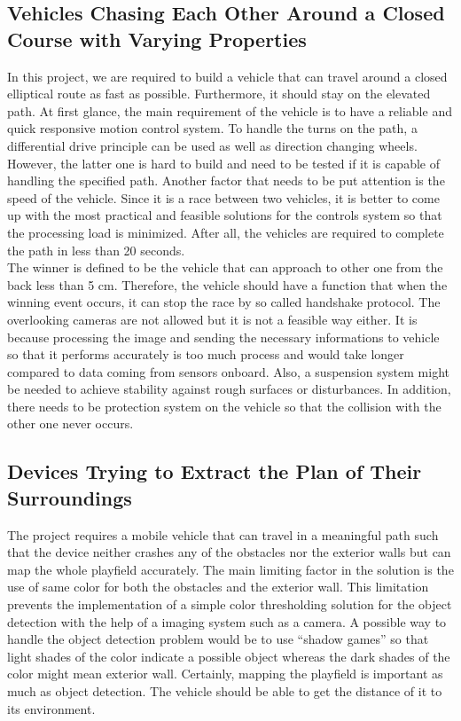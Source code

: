 \documentclass[a4paper,12pt]{article}
\begin{document}
\subsection{Vehicles Chasing Each Other Around a Closed Course with Varying Properties}

In this project, we are required to build a vehicle that can travel around a closed elliptical route as fast as possible. Furthermore, it should stay on the elevated path. At first glance, the main requirement of the vehicle is to have a reliable and quick responsive motion control system. To handle the turns on the path, a differential drive principle can be used as well as direction changing wheels. However, the latter one is hard to build and need to be tested if it is capable of handling the specified path. Another factor that needs to be put attention is the speed of the vehicle. Since it is a race between two vehicles, it is better to come up with the most practical and feasible solutions for the controls system so that the processing load is minimized. After all, the vehicles are required to complete the path in less than 20 seconds.\\

The winner is defined to be the vehicle that can approach to other one from the back less than 5 cm. Therefore, the vehicle should have a function that when the winning event occurs, it can stop the race by so called handshake protocol. The overlooking cameras are not allowed but it is not a feasible way either. It is because processing the image and sending the necessary informations to vehicle so that it performs accurately is too much process and would take longer compared to data coming from sensors onboard. Also, a suspension system might be needed to achieve stability against rough surfaces or disturbances. In addition, there needs to be protection system on the vehicle so that the collision with the other one never occurs.


\subsection{Devices Trying to Extract the Plan of Their Surroundings}
The project requires a mobile vehicle that can travel in a meaningful path such that the device neither crashes any of the obstacles nor the exterior walls but can map the whole playfield accurately. The main limiting factor in the solution is the use of same color for both the obstacles and the exterior wall. This limitation prevents the implementation of a simple color thresholding solution for the object detection with the help of a imaging system such as a camera. A possible way to handle the object detection problem would be to use “shadow games” so that light shades of the color indicate a possible object whereas the dark shades of the color might mean exterior wall. Certainly, mapping the playfield is important as much as object detection. The vehicle should be able to get the distance of it to its environment. \\
\end{document}
